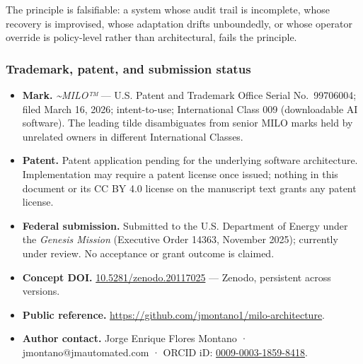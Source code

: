 The principle is falsifiable: a system whose audit trail is incomplete,
whose recovery is improvised, whose adaptation drifts unboundedly, or
whose operator override is policy-level rather than architectural, fails
the principle.

\subsubsection{Trademark, patent, and submission
status}\label{trademark-patent-and-submission-status}

\begin{itemize}
\tightlist
\item
  \textbf{Mark.} \emph{\textasciitilde MILO™} --- U.S. Patent and
  Trademark Office Serial No.~99706004; filed March 16, 2026;
  intent-to-use; International Class 009 (downloadable AI software). The
  leading tilde disambiguates from senior MILO marks held by unrelated
  owners in different International Classes.
\item
  \textbf{Patent.} Patent application pending for the underlying
  software architecture. Implementation may require a patent license
  once issued; nothing in this document or its CC BY 4.0 license on the
  manuscript text grants any patent license.
\item
  \textbf{Federal submission.} Submitted to the U.S. Department of
  Energy under the \emph{Genesis Mission} (Executive Order 14363,
  November 2025); currently under review. No acceptance or grant outcome
  is claimed.
\item
  \textbf{Concept DOI.}
  \href{https://doi.org/10.5281/zenodo.20117025}{10.5281/zenodo.20117025}
  --- Zenodo, persistent across versions.
\item
  \textbf{Public reference.}
  \url{https://github.com/jmontano1/milo-architecture}.
\item
  \textbf{Author contact.} Jorge Enrique Flores Montano ·
  jmontano@jmautomated.com · ORCID iD:
  \href{https://orcid.org/0009-0003-1859-8418}{0009-0003-1859-8418}.
\end{itemize}
